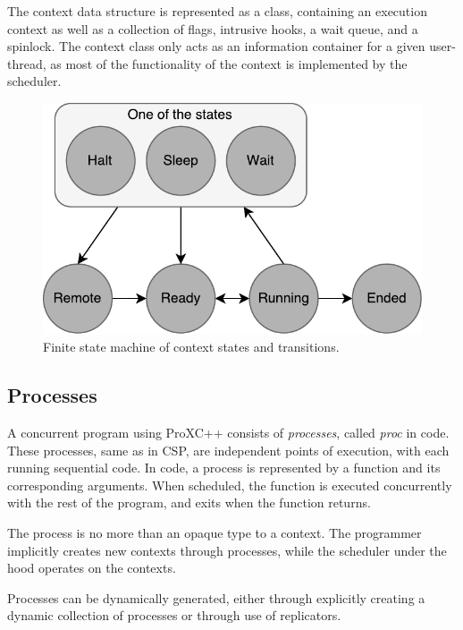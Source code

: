 The context data structure is represented as a class, containing an execution context as well as a collection of flags, intrusive hooks, a wait queue, and a spinlock. The context class only acts as an information container for a given user\hyp{}thread, as most of the functionality of the context is implemented by the scheduler.

\begin{figure}[h!]
    \centering
    \includegraphics[width=0.6\linewidth]{fig/context_states}
    \caption{Finite state machine of context states and transitions.}
    \label{fig:context_states}
\end{figure}


\FloatBarrier
\subsection{Processes}
\label{subsec:processes}

A concurrent program using ProXC++ consists of \textit{processes}, called \textit{proc} in code. These processes, same as in CSP, are independent points of execution, with each running sequential code. In code, a process is represented by a function and its corresponding arguments. When scheduled, the function is executed concurrently with the rest of the program, and exits when the function returns. 

The process is no more than an opaque type to a context. The programmer implicitly creates new contexts through processes, while the scheduler under the hood operates on the contexts.

Processes can be dynamically generated, either through explicitly creating a dynamic collection of processes or through use of replicators.



\FloatBarrier
